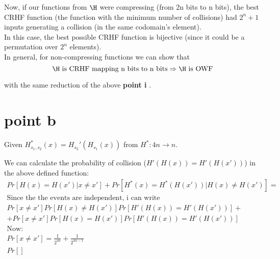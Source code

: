 Now, if our functions from $\H$ were compressing (from 2n bits to n bits), the
best CRHF function (the function with the minimum number of collisions) had
$2^{n} + 1 $ inputs generating a collision (in the same codomain's element).\\

In this case, the best possible CRHF function is bijective (since it could be a permutation over $2^{n}$ elements).\\

In general, for non-compressing functions we can show that 
\[
    \H \text{ is CRHF mapping n bits to n bits}  \Rightarrow \H \text{ is OWF}
\]

with the same reduction of the above \textbf{point i} .

\section{point b}

Given $H_{s_1,s_2}^*(x)=H_{s_2}'(H_{s_1}(x))$ from $H^*:4n \rightarrow n$.

We can calculate the probability of collision ($H'(H(x))=H'(H(x'))$) in the above defined function:
\begin{gather*}
    Pr[H(x)=H(x') | x \neq x' ]+Pr[H^{*}(x)=H^{*}(H(x')) | H(x) \neq H(x') ]=\\
    \text{Since the the events are independent, i can write}\\
    Pr[ x \neq x' ] Pr[ H(x) \neq H(x') ] Pr[ H'(H(x))=H'(H(x')) ] +\\
    + Pr[ x \neq x' ] Pr[ H(x) = H(x') ] Pr[ H'(H(x))=H'(H(x')) ]\\
    \text{Now:}\\
    Pr[ x \neq x' ]=\frac{1}{2^{4n}}+\frac{1}{2^{4n-1}}\\
    Pr[ ]
\end{gather*}
